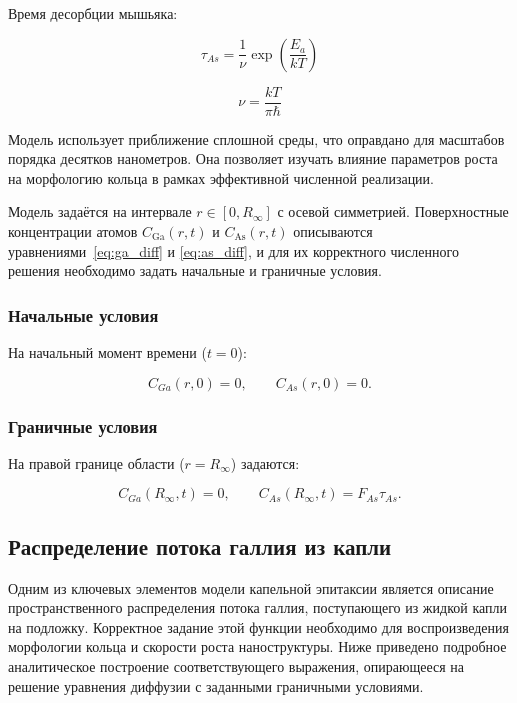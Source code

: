 \documentclass[14pt,oneside]{extarticle}
\begin{document}
Время десорбции мышьяка:

\begin{equation}
\tau_{As}=\frac{1}{\nu}\exp\left(\frac{E_{a}}{kT}\right)
\end{equation}

\begin{equation}
\nu=\frac{kT}{\pi\hbar}
\end{equation}

Модель использует приближение сплошной среды, что оправдано для масштабов порядка десятков нанометров. Она позволяет изучать влияние параметров роста на морфологию кольца в рамках эффективной численной реализации.

Модель задаётся на интервале $r \in [0, R_\infty]$ с осевой симметрией. Поверхностные концентрации атомов $C_{\text{Ga}}(r,t)$ и $C_{\text{As}}(r,t)$ описываются уравнениями~\eqref{eq:ga_diff} и \eqref{eq:as_diff}, и для их корректного численного решения необходимо задать начальные и граничные условия.

\subsubsection*{Начальные условия}

На начальный момент времени ($t = 0$): 

\begin{equation}
C_{Ga}\left(r,0\right)=0, \qquad
C_{As}\left(r,0\right)=0.
\end{equation}

\subsubsection*{Граничные условия}

На правой границе области ($r = R_\infty$) задаются:

\begin{equation}
C_{Ga}\left(R_{\infty},t\right)=0, \qquad
C_{As}\left(R_{\infty},t\right)=F_{As}\tau_{As}.
\end{equation}

\subsection{Распределение потока галлия из капли}

Одним из ключевых элементов модели капельной эпитаксии является описание пространственного распределения потока галлия, поступающего из жидкой капли на подложку. Корректное задание этой функции необходимо для воспроизведения морфологии кольца и скорости роста наноструктуры. Ниже приведено подробное аналитическое построение соответствующего выражения, опирающееся на решение уравнения диффузии с заданными граничными условиями.
\end{document}
